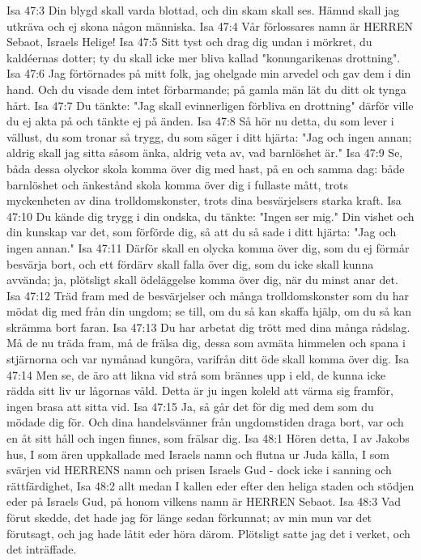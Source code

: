 Isa 47:3  Din blygd skall varda blottad, och din skam skall ses. Hämnd skall jag utkräva och ej skona någon människa.
Isa 47:4  Vår förlossares namn är HERREN Sebaot, Israels Helige!
Isa 47:5  Sitt tyst och drag dig undan i mörkret, du kaldéernas dotter; ty du skall icke mer bliva kallad "konungarikenas drottning".
Isa 47:6  Jag förtörnades på mitt folk, jag ohelgade min arvedel och gav dem i din hand. Och du visade dem intet förbarmande; på gamla män lät du ditt ok tynga hårt.
Isa 47:7  Du tänkte: "Jag skall evinnerligen förbliva en drottning" därför ville du ej akta på och tänkte ej på änden.
Isa 47:8  Så hör nu detta, du som lever i vällust, du som tronar så trygg, du som säger i ditt hjärta: "Jag och ingen annan; aldrig skall jag sitta såsom änka, aldrig veta av, vad barnlöshet är."
Isa 47:9  Se, båda dessa olyckor skola komma över dig med hast, på en och samma dag: både barnlöshet och änkestånd skola komma över dig i fullaste mått, trots myckenheten av dina trolldomskonster, trots dina besvärjelsers starka kraft.
Isa 47:10  Du kände dig trygg i din ondska, du tänkte: "Ingen ser mig." Din vishet och din kunskap var det, som förförde dig, så att du så sade i ditt hjärta: "Jag och ingen annan."
Isa 47:11  Därför skall en olycka komma över dig, som du ej förmår besvärja bort, och ett fördärv skall falla över dig, som du icke skall kunna avvända; ja, plötsligt skall ödeläggelse komma över dig, när du minst anar det.
Isa 47:12  Träd fram med de besvärjelser och många trolldomskonster som du har mödat dig med från din ungdom; se till, om du så kan skaffa hjälp, om du så kan skrämma bort faran.
Isa 47:13  Du har arbetat dig trött med dina många rådslag. Må de nu träda fram, må de frälsa dig, dessa som avmäta himmelen och spana i stjärnorna och var nymånad kungöra, varifrån ditt öde skall komma över dig.
Isa 47:14  Men se, de äro att likna vid strå som brännes upp i eld, de kunna icke rädda sitt liv ur lågornas våld. Detta är ju ingen koleld att värma sig framför, ingen brasa att sitta vid.
Isa 47:15  Ja, så går det för dig med dem som du mödade dig för. Och dina handelsvänner från ungdomstiden draga bort, var och en åt sitt håll och ingen finnes, som frälsar dig.
Isa 48:1  Hören detta, I av Jakobs hus, I som ären uppkallade med Israels namn och flutna ur Juda källa, I som svärjen vid HERRENS namn och prisen Israels Gud - dock icke i sanning och rättfärdighet,
Isa 48:2  allt medan I kallen eder efter den heliga staden och stödjen eder på Israels Gud, på honom vilkens namn är HERREN Sebaot.
Isa 48:3  Vad förut skedde, det hade jag för länge sedan förkunnat; av min mun var det förutsagt, och jag hade låtit eder höra därom. Plötsligt satte jag det i verket, och det inträffade.
